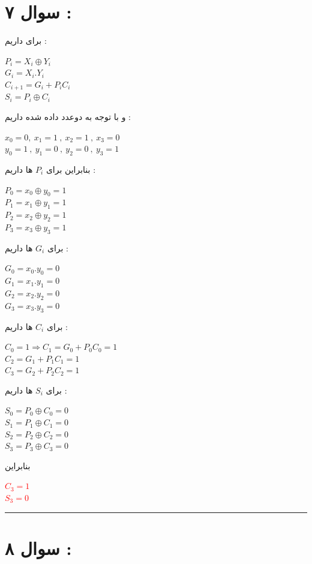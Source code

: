 \documentclass{article}
\begin{document}
\section*{سوال ۷ : }
برای 
داریم  : 
\begin{center}
 $P_i = X_i \oplus Y_i$\\
 $G_i  = X_i  . Y_i$\\
 $C_{i+1} = G_i + P_iC_i$\\
 $S_i = P_i \oplus C_i$
\end{center}
و با توجه به دوعدد داده شده داریم  : 
\begin{center}
	$ x _ 0 = 0  ,  \ x _1 = 1 \ , \  x_2 = 1 \ , \ x_3 = 0$\\
	$y_0 = 1  \ , \ y_1 = 0 \ , \ y_2 = 0  \ , \ y_3 = 1 $
\end{center}
بنابراین برای 
$P_i$
ها داریم  : 
\begin{center}
	$P_0 = x_0 \oplus y_0  = 1 $\\
	$P_1 = x_1 \oplus y_1  = 1 $\\
	$P_2 = x_2 \oplus y_2  = 1 $\\
	$P_3 = x_3 \oplus y_3  = 1 $
\end{center}
برای 
$G_i $
ها داریم  : 
\begin{center}
	$ G_0 = x_0 . y_0 = 0$\\
	$ G_1 = x_1 . y_1 = 0$\\
	$ G_2 = x_2 . y_2 = 0$\\
	$ G_3 = x_3 . y_3 = 0$
\end{center}
برای 
$C_i$
ها داریم  :
\begin{center}
	$C_0 = 1 \Rightarrow C_1 = G_0 + P_0C_0 = 1 $\\
	$C_2 = G_1 + P_1C_1 = 1$\\
	$C_3 = G_2 + P_2C_2 = 1$
\end{center}
\newpage
برای 
$S_i$
ها داریم  : 
\begin{center}
	$ S_0 = P_0 \oplus C_0 = 0$\\
	$ S_1 = P_1 \oplus C_1 = 0$\\
	$ S_2 = P_2 \oplus C_2 = 0$\\
	$ S_3 = P_3 \oplus C_3 = 0$
\end{center}
بنابراین 
\begin{center}
	\textcolor{red}{$C_3 = 1$} \\
	\textcolor{red}{$S_3 = 0$}
\end{center}
\hrule
\section*{سوال ۸ : }
\end{document}
